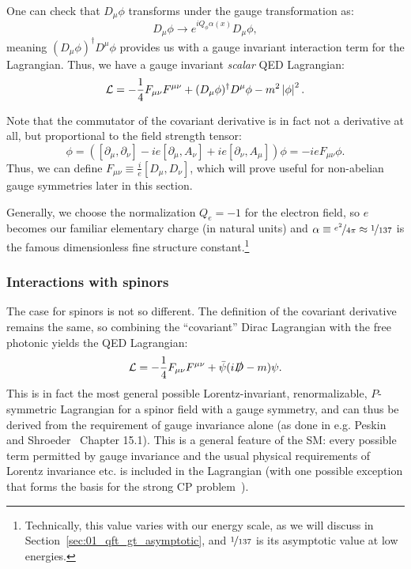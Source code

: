 One can check that $D_\mu\phi$ transforms under the gauge transformation as:
\begin{equation}
	\label{eq:01_qft_gt_maxwell_covariant_derivative_gauge}
	D_\mu\phi \rightarrow e^{iQ_\phi\alpha(x)}D_\mu\phi,
\end{equation}
meaning $(D_\mu\phi)^\dagger D^\mu\phi$ provides us with a gauge invariant interaction term for the Lagrangian.
Thus, we have a gauge invariant \textit{scalar} QED Lagrangian:
\begin{equation}
	\label{eq:01_qft_gt_maxwell_scalar_lagrangian}
	\mathcal L = -\frac{1}{4}F_{\mu\nu}F^{\mu\nu} + (D_\mu\phi)^\dagger D^\mu\phi - m^2\left\lvert \phi \right\rvert^2.
\end{equation}

Note that the commutator of the covariant derivative is in fact not a derivative at all, but proportional to the field strength tensor:
\begin{equation}
	[D_\mu, D_\nu]\phi = ([\partial_\mu, \partial_\nu] - ie[\partial_\mu, A_\nu] + ie[\partial_\nu, A_\mu])\phi = -ieF_{\mu\nu}\phi.
\end{equation}
Thus, we can define $F_{\mu\nu} \equiv \frac{i}{e}[D_\mu, D_\nu]$, which will prove useful for non-abelian gauge symmetries later in this section.

Generally, we choose the normalization $Q_e = -1$ for the electron field, so $e$ becomes our familiar elementary charge (in natural units) and $\alpha\equiv\cnicefrac{e^2}{4\pi} \approx \cnicefrac{1}{137}$ is the famous dimensionless fine structure constant.\footnote{Technically, this value varies with our energy scale, as we will discuss in Section~\ref{sec:01_qft_gt_asymptotic}, and $\cnicefrac{1}{137}$ is its asymptotic value at low energies.}

\subsubsection{Interactions with spinors}

The case for spinors is not so different.
The definition of the covariant derivative remains the same, so combining the ``covariant'' Dirac Lagrangian with the free photonic yields the QED Lagrangian:
\begin{equation}
	\label{eq:01_qft_gt_maxwell_qed_lagrangian}
	\mathcal L = -\frac{1}{4}F_{\mu\nu}F^{\mu\nu} + \bar\psi(i\cslashed D - m)\psi.
\end{equation}
This is in fact the most general possible Lorentz-invariant, renormalizable, $P$-symmetric Lagrangian for a spinor field with a \UU[1] gauge symmetry, and can thus be derived from the requirement of gauge invariance alone (as done in e.g. Peskin and Shroeder~\cite{Peskin:1995ev} Chapter 15.1).
This is a general feature of the SM: every possible term permitted by gauge invariance and the usual physical requirements of Lorentz invariance etc. is included in the Lagrangian (with one possible exception that forms the basis for the strong CP problem~\cite{Wu:1991rw,Mannel:2007zz}).

